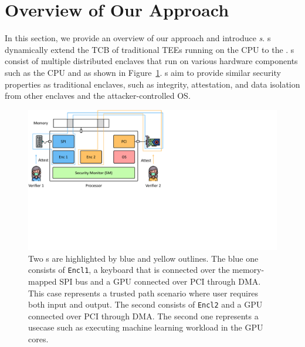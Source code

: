 \section{Overview of Our Approach}
\label{sec:overview}


In this section, we provide an overview of our approach \name and introduce \emph{\nameenclave{}s}. \Nameenclave{}s dynamically extend the TCB of traditional TEEs running on the CPU to the \sphw. \Nameenclave{}s consist of multiple distributed enclaves that run on various hardware components such as the CPU and \sphw as shown in Figure~\ref{fig:new_system}. \Nameenclave{}s aim to provide similar security properties as traditional enclaves, such as integrity, attestation, and data isolation from other enclaves and the attacker-controlled OS. 

\begin{figure}[tbp]
    \centering
	\includegraphics[trim={0 8cm 15cm 0}, clip, width=\linewidth]{chapters/PIE/images/pwe_idea.pdf}
    \caption[\Nameenclave{}s consists of different applications and \sphw]{Two \nameenclave{}s are highlighted by blue and yellow outlines. The blue one consists of \texttt{Encl1}, a keyboard that is connected over the memory-mapped SPI bus and a GPU connected over PCI through DMA. This case represents a trusted path scenario where user requires both input and output. The second consists of \texttt{Encl2} and a GPU connected over PCI through DMA. The second one represents a usecase such as executing machine learning workload in the GPU cores.}
    \label{fig:new_system}
\end{figure}



